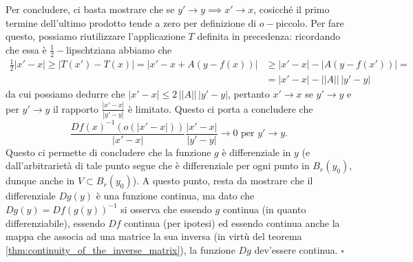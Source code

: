     Per concludere, ci basta mostrare che se $y' \to y \implies x' \to x$, cosicché il primo termine dell'ultimo prodotto tende a zero per definizione di $o-$piccolo. Per fare questo, possiamo riutilizzare
    l'applicazione $T$ definita in precedenza: ricordando che essa è $\frac{1}{2}-$lipschtziana abbiamo che
    \[\begin{aligned}
    \frac{1}{2} |x' - x| \geq  |T(x') - T(x)| = |x' - x + A(y - f(x))| &\geq |x' - x| - |A(y - f(x'))| = & \\
    &=|x'-x| - || A || \, |y'-y| &
    \end{aligned}\]
    da cui possiamo dedurre che $|x' - x| \leq 2 \, || A || \, |y' - y|$, pertanto $x' \to x$ se $y' \to y$ e per $y' \to y$ il rapporto $\frac{|x'-x|}{|y'-y|}$ è limitato. Questo ci porta a concludere che
    \[
    \frac{Df(x)^{-1}(o(|x'-x|))}{|x'-x|} \frac{|x'-x|}{|y'-y|} \to 0 \text{ per } y' \to y.
    \]
    Questo ci permette di concludere che la funzione $g$ è differenziale in $y$ (e dall'arbitrarietà di tale punto segue che è differenziale per ogni punto in $B_r(y_0)$, dunque anche in $V \subset B_r(y_0)$). A
    questo punto, resta da mostrare che il differenziale $Dg(y)$ è una funzione continua, ma dato che $Dg(y) = Df(g(y))^{-1}$ si osserva che essendo $g$ continua (in quanto differenziabile), essendo $Df$ continua (per ipotesi)
    ed essendo continua anche la mappa che associa ad una matrice la sua inversa (in virtù del teorema \ref{thm:continuity_of_the_inverse_matrix}), la funzione $Dg$ dev'essere continua.
\hfill $\square$